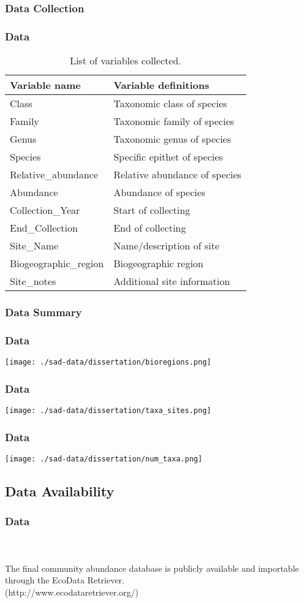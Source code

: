 \documentclass[14pt]{beamer}
\begin{document}
\subsubsection{Data Collection}
\begin{frame}[shrink=30]
\frametitle{Data}
\begin{table}
\begin{tabular}{l|l} 
 Variable name & Variable definitions\\ 
\hline
 Class & Taxonomic class of species \\
 Family & Taxonomic family of species \\
 Genus & Taxonomic genus of species\\
 Species & Specific epithet of species  \\
 Relative\_abundance & Relative abundance of species \\
 Abundance & Abundance of species \\
 Collection\_Year & Start of collecting \\
 End\_Collection & End of collecting \\
 Site\_Name & Name/description of site \\
 Biogeographic\_region & Biogeographic region \\
 Site\_notes & Additional site information \\ 
\end{tabular}
\caption{List of variables collected.}
\end{table}
\end{frame}

\subsubsection{Data Summary}
\begin{frame}{}
\frametitle{Data}
\texttt{[image: ./sad-data/dissertation/bioregions.png]}
\end{frame}

\begin{frame}{}
\frametitle{Data}
\texttt{[image: ./sad-data/dissertation/taxa\_sites.png]}
\end{frame}

\begin{frame}{}
\frametitle{Data}
\texttt{[image: ./sad-data/dissertation/num\_taxa.png]}
\end{frame}

\subsection{Data Availability}
\begin{frame}[t]
\frametitle{Data}
~\\
~\\
The final community abundance database is publicly available and importable through the EcoData Retriever.\\ 
(http://www.ecodataretriever.org/)
\end{frame}
\end{document}
